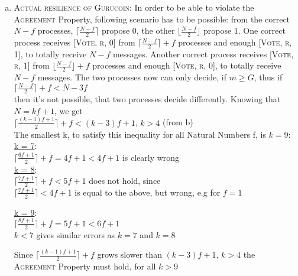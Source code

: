 \documentclass{article}
\begin{document}
\begin{enumerate}[a)]
        \item \textsc{Actual resilience of Gurucoin:}
        In order to be able to violate the \textsc{Agreement} Property, following scenario has to be possible:
        from the correct $N - f$ processes, $\lceil  \frac{N - f}{2} \rceil$ propose $0$, the other $\lfloor \frac{N - f}{2} \rfloor$ propose $1$.
        One correct process receives \textsc{[Vote, r, 0]} from $\lceil  \frac{N - f}{2} \rceil + f$ processes and enough \textsc{[Vote, r, 1]}, to totally receive $N - f$ messages.
        Another correct process receives \textsc{[Vote, r, 1]} from $\lfloor  \frac{N - f}{2} \rfloor + f$ processes and enough \textsc{[Vote, r, 0]}, to totally receive $N - f$ messages.
        The two processes now can only decide, if $m \geq G$, thus if\\
        
        $\lceil  \frac{N - f}{2} \rceil + f < N - 3f$\\
        
        then it's not possible, that two processes decide differently. Knowing that $N = kf + 1$, we get\\

        $\lceil  \frac{(k - 1)f + 1}{2} \rceil + f < (k - 3)f + 1$, $k > 4$ (from b)\\

        The smallest k, to satisfy this inequality for all Natural Numbers f, is $k = 9$: \\
        
        \underline{k = 7}:\\
        $\lceil  \frac{6f + 1}{2} \rceil + f = 4f + 1 < 4f + 1$ is clearly wrong\\
        
        \underline{k = 8}:\\
        $\lceil  \frac{7f + 1}{2} \rceil + f < 5f + 1$ does not hold, since\\

        $\lceil  \frac{7f + 1}{2} \rceil < 4f + 1$ is equal to the above, but wrong, e.g for $f = 1$

        \underline{k = 9}:\\
        $\lceil  \frac{8f + 1}{2} \rceil + f = 5f + 1 < 6f + 1$\\

        $k < 7$ gives similar errors as $k = 7$ and $k = 8$

        Since $\lceil  \frac{(k - 1)f + 1}{2} \rceil + f$ grows slower than $(k - 3)f + 1$, $k > 4$ the \textsc{Agreement} Property must hold, for all $k > 9$


\end{enumerate}
\end{document}
